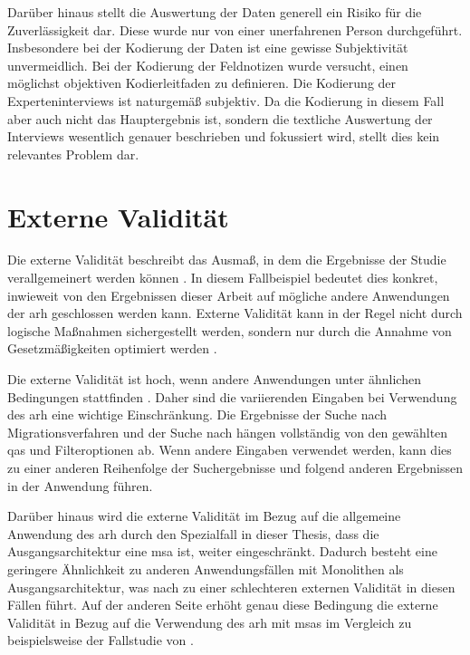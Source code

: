 Darüber hinaus stellt die Auswertung der Daten generell ein Risiko für die Zuverlässigkeit dar. 
Diese wurde nur von einer unerfahrenen Person durchgeführt. 
Insbesondere bei der Kodierung der Daten ist eine gewisse Subjektivität unvermeidlich.
Bei der Kodierung der Feldnotizen wurde versucht, einen möglichst objektiven Kodierleitfaden zu definieren.
Die Kodierung der Experteninterviews ist naturgemäß subjektiv.
Da die Kodierung in diesem Fall aber auch nicht das Hauptergebnis ist, sondern die textliche Auswertung der Interviews wesentlich genauer beschrieben und fokussiert wird, stellt dies kein relevantes Problem dar.

\section{Externe Validität}

Die externe Validität beschreibt das Ausmaß, in dem die Ergebnisse der Studie verallgemeinert werden können \cite{Runeson2009}. 
In diesem Fallbeispiel bedeutet dies konkret, inwieweit von den Ergebnissen dieser Arbeit auf mögliche andere Anwendungen der \gls{arh} geschlossen werden kann.
Externe Validität kann in der Regel nicht durch logische Maßnahmen sichergestellt werden, sondern nur durch die Annahme von Gesetzmäßigkeiten optimiert werden \cite{campbell2015experimental}. %

Die externe Validität ist hoch, wenn andere Anwendungen unter ähnlichen Bedingungen statt\-fin\-den \cite{campbell2015experimental}.
Daher sind die variierenden Eingaben bei Verwendung des \gls{arh} eine wichtige Einschränkung.
Die Ergebnisse der Suche nach Migrationsverfahren und der Suche nach \bpp hängen vollständig von den gewählten \glspl{qa} und Filteroptionen ab.
Wenn andere Eingaben verwendet werden, kann dies zu einer anderen Reihenfolge der Suchergebnisse und folgend anderen Ergebnissen in der Anwendung führen.

Darüber hinaus wird die externe Validität im Bezug auf die allgemeine Anwendung des \gls{arh} durch den Spezialfall in dieser Thesis, dass die Ausgangsarchitektur eine \gls{msa} ist, weiter eingeschränkt.
Dadurch besteht eine geringere Ähnlichkeit zu anderen Anwendungsfällen mit Monolithen als Ausgangsarchitektur, was nach  zu einer schlechteren externen Validität in diesen Fällen führt.
Auf der anderen Seite erhöht genau diese Bedingung die externe Validität in Bezug auf die Verwendung des \gls{arh} mit \glspl{msa} im Vergleich zu beispielsweise der Fallstudie von .

